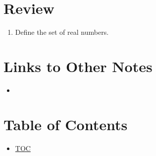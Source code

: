 \section*{Review}
\begin{enumerate}
  \item Define the set of real numbers.
\end{enumerate}


\section*{Links to Other Notes}
\begin{itemize}
  \item \hyperref[]{}
\end{itemize}

\section*{Table of Contents}

\begin{itemize}
  \item \hyperref[toc]{TOC}
\end{itemize}

